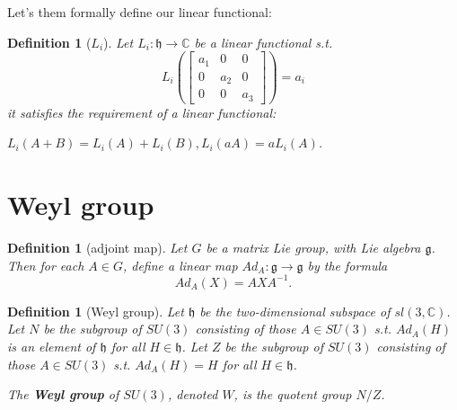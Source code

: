 \documentclass[a4paper]{article}
\newcommand{\C}{\mathbb{C}}
\theoremstyle{bfnote} %
\theoremstyle{bfnote}                  %
\newtheorem{defn}[thm]{Definition}
\theoremstyle{example}                       %
\theoremstyle{remark}                       %
\numberwithin{equation}{section}
\begin{document}
Let's them formally define our linear functional: 
\begin{defn}[$L_i$]
	Let $L_i: \mathfrak{h} \to \C$ be a linear functional s.t. \[
		L_i \left(\begin{bmatrix} a_1 & 0 &0 \\ 0 & a_2 & 0 \\ 0 &0 &a_3 \end{bmatrix}\right) = a_i
	\] it satisfies the requirement of a linear functional:

	$L_i(A+B) = L_i(A) + L_i(B), L_i(aA) = aL_i(A)$.
\end{defn}

\section{Weyl group}

\begin{defn}[adjoint map]	
	Let $G$ be a matrix Lie group, with Lie algebra  $\mathfrak{g}$. Then for each  $A \in G$, define a linear map $Ad_A: \mathfrak{g} \to  \mathfrak{g}$ by the formula \[
		Ad_A(X) = AXA^{-1}.
	\] 
\end{defn}

\begin{defn}[Weyl group]
	Let $\mathfrak{h}$ be the two-dimensional subspace of  $sl(3, \C)$. Let  $N$ be the subgroup of  $SU(3)$ consisting of those  $ A \in SU(3)$ s.t. $Ad_A(H)$ is an element of  $\mathfrak{h}$ for all  $H \in \mathfrak{h}$. Let $Z$ be the subgroup of  $SU(3)$ consisting of those  $A \in SU(3)$ s.t. $Ad_A(H)=H$ for all  $H \in \mathfrak{h}$.

	The \textbf{Weyl group} of $SU(3)$, denoted  $W$, is the quotent group  $N/Z$. 
\end{defn}



\nocite{*}

\newpage

\end{document}
